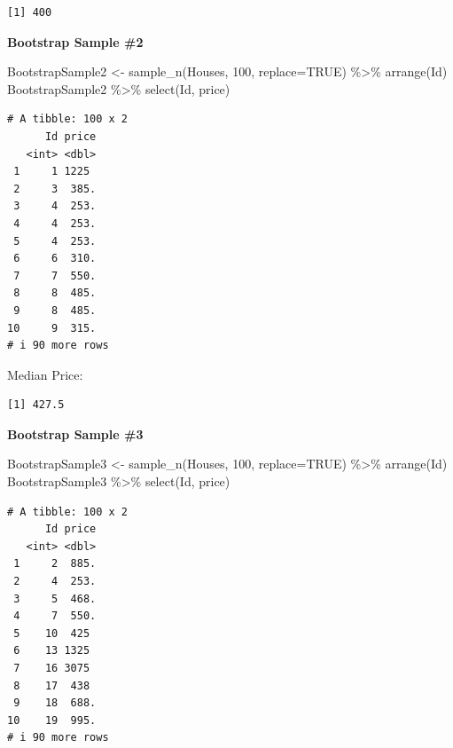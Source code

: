 \documentclass[
  letterpaper,
  DIV=11,
  numbers=noendperiod]{scrreprt}
\newenvironment{Shaded}{\begin{snugshade}}{\end{snugshade}}
\newcommand{\AttributeTok}[1]{\textcolor[rgb]{0.40,0.45,0.13}{#1}}
\newcommand{\ConstantTok}[1]{\textcolor[rgb]{0.56,0.35,0.01}{#1}}
\newcommand{\DecValTok}[1]{\textcolor[rgb]{0.68,0.00,0.00}{#1}}
\newcommand{\FunctionTok}[1]{\textcolor[rgb]{0.28,0.35,0.67}{#1}}
\newcommand{\NormalTok}[1]{\textcolor[rgb]{0.00,0.23,0.31}{#1}}
\newcommand{\OtherTok}[1]{\textcolor[rgb]{0.00,0.23,0.31}{#1}}
\newcommand{\SpecialCharTok}[1]{\textcolor[rgb]{0.37,0.37,0.37}{#1}}
\begin{document}
\begin{verbatim}
[1] 400
\end{verbatim}

\textbf{Bootstrap Sample \#2}

\begin{Shaded}
\begin{Highlighting}[]
\NormalTok{BootstrapSample2 }\OtherTok{\textless{}{-}} \FunctionTok{sample\_n}\NormalTok{(Houses, }\DecValTok{100}\NormalTok{, }\AttributeTok{replace=}\ConstantTok{TRUE}\NormalTok{) }\SpecialCharTok{\%\textgreater{}\%} \FunctionTok{arrange}\NormalTok{(Id)}
\NormalTok{BootstrapSample2 }\SpecialCharTok{\%\textgreater{}\%} \FunctionTok{select}\NormalTok{(Id, price)}
\end{Highlighting}
\end{Shaded}

\begin{verbatim}
# A tibble: 100 x 2
      Id price
   <int> <dbl>
 1     1 1225 
 2     3  385.
 3     4  253.
 4     4  253.
 5     4  253.
 6     6  310.
 7     7  550.
 8     8  485.
 9     8  485.
10     9  315.
# i 90 more rows
\end{verbatim}

Median Price:

\begin{Shaded}
\end{Shaded}

\begin{verbatim}
[1] 427.5
\end{verbatim}

\textbf{Bootstrap Sample \#3}

\begin{Shaded}
\begin{Highlighting}[]
\NormalTok{BootstrapSample3 }\OtherTok{\textless{}{-}} \FunctionTok{sample\_n}\NormalTok{(Houses, }\DecValTok{100}\NormalTok{, }\AttributeTok{replace=}\ConstantTok{TRUE}\NormalTok{) }\SpecialCharTok{\%\textgreater{}\%} \FunctionTok{arrange}\NormalTok{(Id)}
\NormalTok{BootstrapSample3 }\SpecialCharTok{\%\textgreater{}\%} \FunctionTok{select}\NormalTok{(Id, price)}
\end{Highlighting}
\end{Shaded}

\begin{verbatim}
# A tibble: 100 x 2
      Id price
   <int> <dbl>
 1     2  885.
 2     4  253.
 3     5  468.
 4     7  550.
 5    10  425 
 6    13 1325 
 7    16 3075 
 8    17  438 
 9    18  688.
10    19  995.
# i 90 more rows
\end{verbatim}
\end{document}
